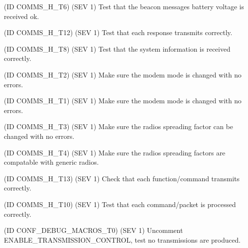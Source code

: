 \begin{DoxyRefList}
(ID C\+O\+M\+M\+S\+\_\+\+H\+\_\+\+T6) (S\+EV 1) Test that the beacon messages battery voltage is received ok. 
\item[\label{test__test000013}%
\Hypertarget{test__test000013}%
Global \hyperlink{communication_8h_af86331e2820ea70a7928919915937077}{Communication\+\_\+\+Send\+\_\+\+Response} (uint8\+\_\+t resp\+Id, uint8\+\_\+t $\ast$opt\+Data=nullptr, size\+\_\+t opt\+Data\+Len=0, bool override\+Modem=false)](ID C\+O\+M\+M\+S\+\_\+\+H\+\_\+\+T12) (S\+EV 1) Test that each response transmits correctly. 
\item[\label{test__test000008}%
\Hypertarget{test__test000008}%
Global \hyperlink{communication_8h_ae4e350e62342431fda2184ff0dc47a65}{Communication\+\_\+\+Send\+\_\+\+System\+\_\+\+Info} ()](ID C\+O\+M\+M\+S\+\_\+\+H\+\_\+\+T8) (S\+EV 1) Test that the system information is received correctly. 
\item[\label{test__test000003}%
\Hypertarget{test__test000003}%
Global \hyperlink{communication_8h_a59478c57f2735f94bf2f19a272a75c02}{Communication\+\_\+\+Set\+\_\+\+Configuration} (uint8\+\_\+t $\ast$opt\+Data, uint8\+\_\+t opt\+Data\+Len)](ID C\+O\+M\+M\+S\+\_\+\+H\+\_\+\+T2) (S\+EV 1) Make sure the modem mode is changed with no errors. 
\item[\label{test__test000002}%
\Hypertarget{test__test000002}%
Global \hyperlink{communication_8h_a0183d47f45dfdb348647c3db1a75b73c}{Communication\+\_\+\+Set\+\_\+\+Modem} (uint8\+\_\+t modem)](ID C\+O\+M\+M\+S\+\_\+\+H\+\_\+\+T1) (S\+EV 1) Make sure the modem mode is changed with no errors. 
\item[\label{test__test000004}%
\Hypertarget{test__test000004}%
Global \hyperlink{communication_8h_ad184c979eb82cc1c8d4fc32a802cb758}{Communication\+\_\+\+Set\+\_\+\+Spreading\+Factor} (uint8\+\_\+t sf\+Mode)](ID C\+O\+M\+M\+S\+\_\+\+H\+\_\+\+T3) (S\+EV 1) Make sure the radio\textquotesingle{}s spreading factor can be changed with no errors. 

(ID C\+O\+M\+M\+S\+\_\+\+H\+\_\+\+T4) (S\+EV 1) Make sure the radio\textquotesingle{}s spreading factors are compatable with generic radios. 
\item[\label{test__test000014}%
\Hypertarget{test__test000014}%
Global \hyperlink{communication_8h_a46802cdf83e9de4cab3ebd4a00256aeb}{Communication\+\_\+\+Transmit} (uint8\+\_\+t $\ast$data, uint8\+\_\+t len, bool override\+Modem=true)](ID C\+O\+M\+M\+S\+\_\+\+H\+\_\+\+T13) (S\+EV 1) Check that each function/command transmits correctly. 
\item[\label{test__test000011}%
\Hypertarget{test__test000011}%
Global \hyperlink{communication_8h_ab6495de804d5d54d071fe8b4dd408aba}{Comunication\+\_\+\+Parse\+\_\+\+Frame} (uint8\+\_\+t $\ast$frame, size\+\_\+t len)](ID C\+O\+M\+M\+S\+\_\+\+H\+\_\+\+T10) (S\+EV 1) Test that each command/packet is processed correctly. 
\item[\label{test__test000016}%
\Hypertarget{test__test000016}%
Module \hyperlink{group__defines__debug__macros}{defines\+\_\+debug\+\_\+macros} ](ID C\+O\+N\+F\+\_\+\+D\+E\+B\+U\+G\+\_\+\+M\+A\+C\+R\+O\+S\+\_\+\+T0) (S\+EV 1) Uncomment E\+N\+A\+B\+L\+E\+\_\+\+T\+R\+A\+N\+S\+M\+I\+S\+S\+I\+O\+N\+\_\+\+C\+O\+N\+T\+R\+OL, test no transmissions are produced. 


\end{DoxyRefList}
